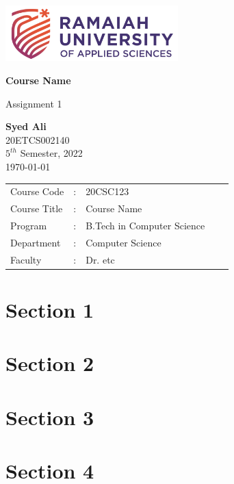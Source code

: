 \documentclass[12pt]{article}
\newcommand{\Course}{Course Name}
\newcommand{\Name}{Syed Ali}
\newcommand{\Regno}{20ETCS002140}
\newcommand{\Batch}{$5^{th}$ Semester, 2022}
\newcommand{\Date}{\today}
\newcommand{\Courseno}{20CSC123}
\newcommand{\Program}{B.Tech in Computer Science}
\newcommand{\Department}{Computer Science}
\newcommand{\Faculty}{Dr. etc}
\begin{document}
\onehalfspacing
\begin{titlepage}

  \begin{center}
    \vspace*{\fill}
    \includegraphics[width=0.5\textwidth]{images/school logo.png}
    \vspace{1cm}

    \Huge
    \textbf{\Course}

    \vspace{0.5cm}
    \LARGE
    Assignment 1

    \vspace{1cm}

    \textbf{\Name}
    \vspace{0.5cm}\\
    \Large
    \Regno\\
    \Batch\\
    \Date
    \vspace{1.5cm}

  \end{center}
  \begin{center}
    \Large
    \begin{tabular}{ l l l l l }
      Course Code  & : & \Courseno   \\
      Course Title & : & \Course     \\
      Program      & : & \Program    \\
      Department   & : & \Department \\
      Faculty      & : & \Faculty
    \end{tabular}
  \end{center}
  \vspace*{\fill}
\end{titlepage}

% 
% 

\tableofcontents
\newpage

\section{Section 1}

\newpage

\section{Section 2}

\newpage

\section{Section 3}

\newpage

\section{Section 4}


% 
% 
\end{document}
